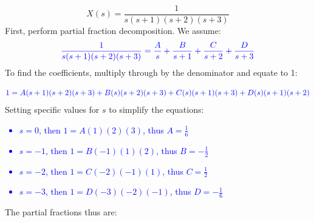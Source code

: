 \documentclass{article}
\begin{document}
\[
	X(s) = \frac{1}{s(s+1)(s+2)(s+3)}
\]
First, perform partial fraction decomposition. We assume:
\[
	\textcolor{blue}{\frac{1}{s(s+1)(s+2)(s+3)} = \frac{A}{s} + \frac{B}{s+1} + \frac{C}{s+2} + \frac{D}{s+3}}
\]
To find the coefficients, multiply through by the denominator and equate to 1:
       
\[
	\textcolor{blue}{1 = A(s+1)(s+2)(s+3) + B(s)(s+2)(s+3) + C(s)(s+1)(s+3) + D(s)(s+1)(s+2)}
\]
Setting specific values for \(s\) to simplify the equations:

\textcolor{blue}{\begin{itemize}
	\item \(s = 0\), then \(1 = A(1)(2)(3)\), thus \(A = \frac{1}{6}\)
	\item \(s = -1\), then \(1 = B(-1)(1)(2)\), thus \(B = -\frac{1}{2}\)
	\item \(s = -2\), then \(1 = C(-2)(-1)(1)\), thus \(C = \frac{1}{2}\)
	\item \(s = -3\), then \(1 = D(-3)(-2)(-1)\), thus \(D = -\frac{1}{6}\)
	\end{itemize}}
\noindent The partial fractions thus are:
\end{document}
